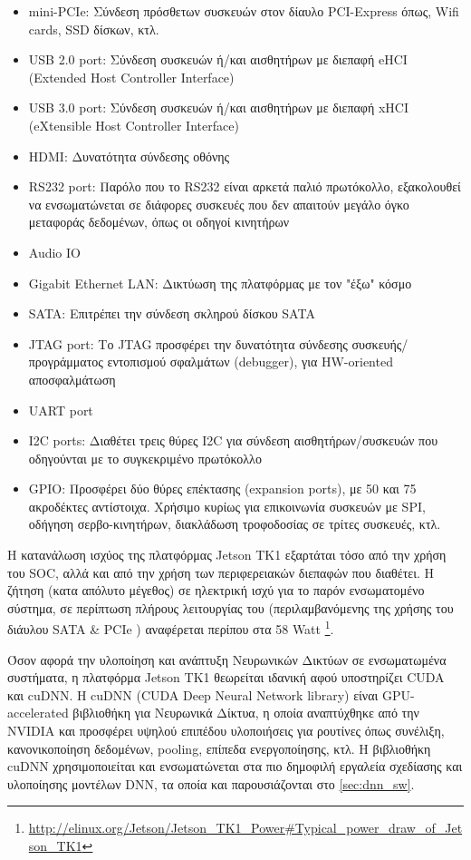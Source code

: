 \begin{itemize}
  \setlength\itemsep{0em}
  \item{mini-PCIe: Σύνδεση πρόσθετων συσκευών στον δίαυλο PCI-Express όπως, Wifi cards, SSD δίσκων, κτλ.}
  \item{USB 2.0 port: Σύνδεση συσκευών ή/και αισθητήρων με διεπαφή eHCI (Extended Host Controller Interface)}
  \item{USB 3.0 port: Σύνδεση συσκευών ή/και αισθητήρων με διεπαφή xHCI (eXtensible Host Controller Interface)}
  \item{HDMI: Δυνατότητα σύνδεσης οθόνης}
  \item{RS232 port: Παρόλο που το RS232 είναι αρκετά παλιό πρωτόκολλο, εξακολουθεί να ενσωματώνεται σε διάφορες συσκευές που δεν απαιτούν μεγάλο όγκο μεταφοράς δεδομένων, όπως οι οδηγοί κινητήρων}
  \item{Audio IO}
  \item{Gigabit Ethernet LAN: Δικτύωση της πλατφόρμας με τον "έξω" κόσμο}
  \item{SATA: Επιτρέπει την σύνδεση σκληρού δίσκου SATA}
  \item{JTAG port: Το JTAG προσφέρει την δυνατότητα σύνδεσης συσκευής/προγράμματος εντοπισμού σφαλμάτων (debugger), για HW-oriented αποσφαλμάτωση}
  \item{UART port}
  \item{I2C ports: Διαθέτει τρεις θύρες I2C για σύνδεση αισθητήρων/συσκευών που οδηγούνται με το συγκεκριμένο πρωτόκολλο}
  \item{GPIO: Προσφέρει δύο θύρες επέκτασης (expansion ports), με 50 και 75 ακροδέκτες αντίστοιχα. Χρήσιμο κυρίως για επικοινωνία συσκευών με SPI, οδήγηση σερβο-κινητήρων, διακλάδωση τροφοδοσίας σε τρίτες συσκευές, κτλ.}
\end{itemize}

Η κατανάλωση ισχύος της πλατφόρμας Jetson TK1 εξαρτάται τόσο από την χρήση
του SOC, αλλά και από την χρήση των περιφερειακών διεπαφών που διαθέτει. Η
ζήτηση (κατα απόλυτο μέγεθος) σε ηλεκτρική ισχύ για το παρόν ενσωματομένο σύστημα,
σε περίπτωση πλήρους λειτουργίας του (περιλαμβανόμενης της χρήσης του διάυλου SATA \& PCIe )
αναφέρεται περίπου στα 58 Watt \footnote{\url{http://elinux.org/Jetson/Jetson_TK1_Power\#Typical_power_draw_of_Jetson_TK1}}.

Όσον αφορά την υλοποίηση και ανάπτυξη Νευρωνικών Δικτύων σε ενσωματωμένα συστήματα,
η πλατφόρμα Jetson TK1 θεωρείται ιδανική αφού υποστηρίζει CUDA και cuDNN.
H cuDNN (CUDA Deep Neural Network library) είναι GPU-accelerated βιβλιοθήκη για Νευρωνικά Δίκτυα,
η οποία αναπτύχθηκε από την NVIDIA και προσφέρει υψηλού επιπέδου υλοποιήσεις για ρουτίνες όπως συνέλιξη,
κανονικοποίηση δεδομένων, pooling, επίπεδα ενεργοποίησης, κτλ.
Η βιβλιοθήκη cuDNN χρησιμοποιείται και ενσωματώνεται στα πιο δημοφιλή εργαλεία σχεδίασης και υλοποίησης μοντέλων DNN,
τα οποία και παρουσιάζονται στο \autoref{sec:dnn_sw}.


